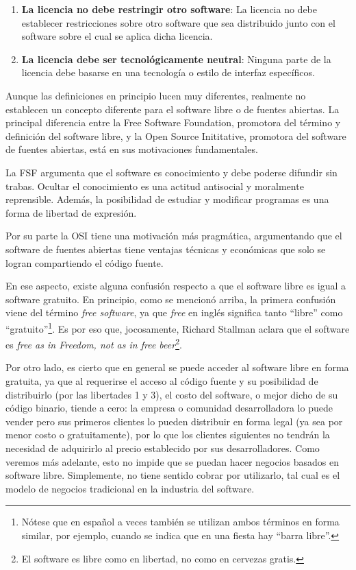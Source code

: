 \begin{enumerate}
\item {\bf La licencia no debe restringir otro software}: La licencia no debe establecer restricciones sobre otro software que sea distribuido junto con el software sobre el cual se aplica dicha licencia. 

\item {\bf La licencia debe ser tecnológicamente neutral}: Ninguna parte de la licencia debe basarse en una tecnología o estilo de interfaz específicos.

\end{enumerate}

Aunque las definiciones en principio lucen muy diferentes, realmente no establecen un concepto diferente para el software libre o de fuentes abiertas. La principal diferencia entre la Free Software Foundation, promotora del término y definición del software libre, y la Open Source Inititative, promotora del software de fuentes abiertas, está en sus motivaciones fundamentales.

La FSF argumenta que el software es conocimiento y debe poderse difundir sin trabas. Ocultar el conocimiento es una actitud antisocial y moralmente reprensible. Además, la posibilidad de estudiar y modificar programas es una forma de libertad de expresión.

Por su parte la OSI tiene una motivación más pragmática, argumentando que el software de fuentes abiertas tiene ventajas técnicas y económicas que solo se logran compartiendo el código fuente.

En ese aspecto, existe alguna confusión respecto a que el software libre es igual a software gratuito. En principio, como se mencionó arriba, la primera confusión viene del término \emph{free software}, ya que \emph{free} en inglés significa tanto ``libre'' como ``gratuito''\footnote{Nótese que en español a veces también se utilizan ambos términos en forma similar, por ejemplo, cuando se indica que en una fiesta hay ``barra libre''.}. Es por eso que, jocosamente, Richard Stallman aclara que el software es \emph{free as in Freedom, not as in free beer}\footnote{El software es libre como en libertad, no como en cervezas gratis.}.

Por otro lado, es cierto que en general se puede acceder al software libre en forma gratuita, ya que al requerirse el acceso al código fuente y su posibilidad de distribuirlo (por las libertades 1 y 3), el costo del software, o mejor dicho de su código binario, tiende a cero: la empresa o comunidad desarrolladora lo puede vender pero sus primeros clientes lo pueden distribuir en forma legal (ya sea por menor costo o gratuitamente), por lo que los clientes siguientes no tendrán la necesidad de adquirirlo al precio establecido por sus desarrolladores. Como veremos más adelante, esto no impide que se puedan hacer negocios basados en software libre. Simplemente, no tiene sentido cobrar por utilizarlo, tal cual es el modelo de negocios tradicional en la industria del software.

